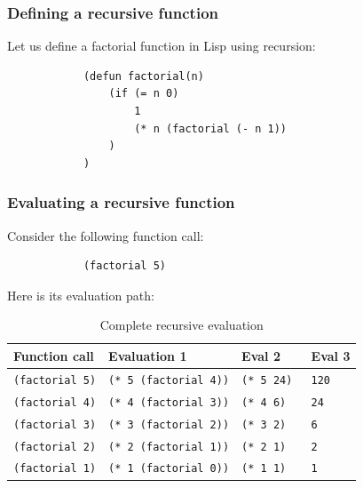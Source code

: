 \documentclass{beamer}
\begin{document}
\begin{frame}[fragile]
	\frametitle{Defining a recursive function}
		Let us define a factorial function in Lisp using recursion:\\
		\begin{example}
			\begin{verbatim}
			(defun factorial(n)
			    (if (= n 0)
			        1
			        (* n (factorial (- n 1))
			    )
			)
			\end{verbatim}
		\end{example}
		
\end{frame}

\begin{frame}[fragile]
	\frametitle{Evaluating a recursive function}
	\begin{table}
		Consider the following function call:
		\begin{example}
			\begin{verbatim}
			(factorial 5)
			\end{verbatim}
		\end{example}
		
		Here is its evaluation path:
		\begin{tabular}{l l l l}
			\toprule
			\textbf{Function call} & \textbf{Evaluation 1} & \textbf{Eval 2} & \textbf{Eval 3}\\
			\midrule
			\texttt{(factorial 5)} &\texttt{(* 5 (factorial 4))} & \texttt{(* 5 24) } & \texttt{120} \\
			\texttt{(factorial 4)} &\texttt{(* 4 (factorial 3))} & \texttt{(* 4 6)  } & \texttt{24} \\
			\texttt{(factorial 3)} &\texttt{(* 3 (factorial 2))} & \texttt{(* 3 2)  } & \texttt{6} \\
			\texttt{(factorial 2)} &\texttt{(* 2 (factorial 1))} & \texttt{(* 2 1)  } & \texttt{2} \\
			\texttt{(factorial 1)} &\texttt{(* 1 (factorial 0))} & \texttt{(* 1 1)  } & \texttt{1} \\
			\bottomrule
		\end{tabular}
		\caption{Complete recursive evaluation}
	\end{table}
\end{frame}
\end{document}
